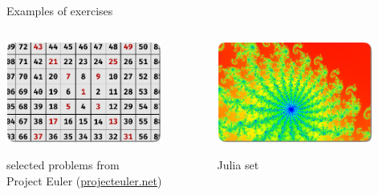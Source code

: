 \documentclass[svgnames]{beamer}
\begin{document}
\begin{frame}{Examples of exercises}

 \vspace{-0.7truecm}
 \begin{columns}[t]
  \begin{column}{0.5\textwidth}
   \begin{center}
    \includegraphics[width=0.8\textwidth]{spiral}

    selected problems from\\[-0.05truecm] Project Euler (\url{projecteuler.net})
   \end{center}
  \end{column}%
  \begin{column}{0.5\textwidth}
   \begin{center}
    \includegraphics[width=0.8\textwidth]{julia}

    Julia set
   \end{center}
  \end{column}%
 \end{columns}


\end{frame}
\end{document}
